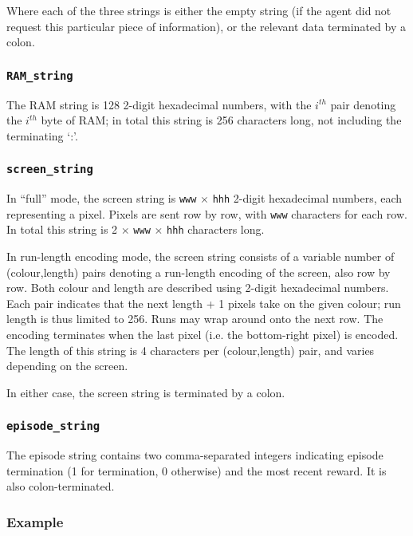 \documentclass[12pt]{article}
\begin{document}
Where each of the three strings is either the empty string (if the agent did not request this
particular piece of information), or the relevant data terminated by a colon.

\subsubsection{\texttt{RAM\_string}}

The RAM string is 128 2-digit hexadecimal numbers, with the $i^{th}$ pair denoting the
$i^{th}$ byte of RAM; in total this string is 256 characters long, not including the terminating
`:'.

\subsubsection{\texttt{screen\_string}}

In ``full'' mode, the screen string is \texttt{www} $\times$ \texttt{hhh} 2-digit hexadecimal numbers, each representing a pixel. Pixels are sent row by row, with \texttt{www} characters for each row. In total this string is 2 $\times$ \texttt{www} $\times$ \texttt{hhh} characters long.

In run-length encoding mode, the screen string consists of a variable number of (colour,length) pairs denoting a run-length encoding of the screen, also row by row. Both colour and length are described using 2-digit hexadecimal numbers. Each pair indicates that the next length + 1 pixels take on the given colour; run length is thus limited to 256. Runs may wrap around onto the next row. The encoding terminates when the last pixel (i.e. the bottom-right pixel) is encoded. The length of this string is 4 characters per (colour,length) pair, and varies depending on the screen.

In either case, the screen string is terminated by a colon.

\subsubsection{\texttt{episode\_string}}

The episode string contains two comma-separated integers indicating episode termination (1 for
termination, 0 otherwise) and the most recent reward. It is also colon-terminated.

\subsubsection{Example}
\end{document}
